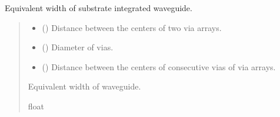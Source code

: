 \documentclass[letterpaper,10pt,english]{sphinxmanual}
\begin{document}

\begin{fulllineitems}
\label{\detokenize{components:components.SIW_EquivalentWidth}}
\pysigstartsignatures
{}
\pysigstopsignatures
\sphinxAtStartPar
Equivalent width of substrate integrated waveguide.
\begin{quote}\begin{description}
\begin{itemize}
\item {} 
\sphinxAtStartPar
{} () \textendash{} Distance between the centers of two via arrays.

\item {} 
\sphinxAtStartPar
{} () \textendash{} Diameter of vias.

\item {} 
\sphinxAtStartPar
{} () \textendash{} Distance between the centers of consecutive vias of via arrays.

\end{itemize}

\sphinxAtStartPar
Equivalent width of waveguide.

\sphinxAtStartPar
float

\end{description}\end{quote}

\end{fulllineitems}

\end{document}
